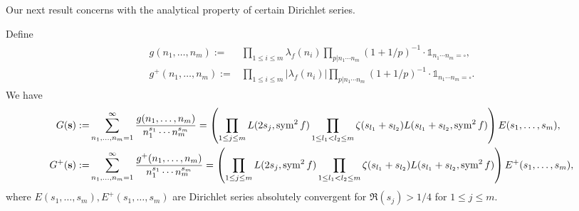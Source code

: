 \documentclass[twoside,leqno,10pt, A4]{amsart}
\begin{document}
    Our next result concerns with the analytical property of certain Dirichlet series.
\begin{lemma}\label{Dirichletseries}
  Define
  \begin{align}
  \label{f}
  \begin{split}
g(n_1, \ldots, n_{m}):= & \prod_{1\leq i\leq m}\lambda_f(n_i)\prod_{p|n_1\cdots n_m}(1+1/p)^{-1}\cdot \mathds{1}_{n_1\cdots n_m=\square}, \\
g^+(n_1, \ldots, n_{m}):= & \prod_{1\leq i\leq m}|\lambda_f(n_i)|\prod_{p|n_1\cdots n_m}(1+1/p)^{-1}\cdot \mathds{1}_{n_1\cdots n_m=\square}.
\end{split}
  \end{align}
We have
\begin{align}
 \label{Gdef}
  \begin{split}
G({\bf s}):=& \sum_{n_1, \ldots, n_{m}=1}^{\infty} \frac{g(n_1, \ldots, n_{m})}{n_1^{s_1} \cdots n_m^{s_{m}}} =  \left( \prod_{1 \leq j \leq m} L(2s_j, \operatorname{sym}^2f ) \prod_{1 \leq l_1 < l_2 \leq m} \zeta(s_{l_1} + s_{l_2})L (s_{l_1} + s_{l_2},\operatorname{sym}^2f)\right) E(s_1, \ldots, s_{m}), \\
 G^+({\bf s}):=& \sum_{n_1, \ldots, n_{m}=1}^{\infty} \frac{g^+(n_1, \ldots, n_{m})}{n_1^{s_1} \cdots n_m^{s_{m}}} =  \left( \prod_{1 \leq j \leq m} L(2s_j, \operatorname{sym}^2f ) \prod_{1 \leq l_1 < l_2 \leq m} \zeta(s_{l_1} + s_{l_2})L (s_{l_1} + s_{l_2},\operatorname{sym}^2f)\right) E^+(s_1, \ldots, s_{m}),
\end{split}
\end{align}
where \( E(s_1, \ldots, s_{m}), E^+(s_1, \ldots, s_{m})  \) are Dirichlet series absolutely convergent for \( \Re(s_j) > 1/4 \) for \( 1 \leq j \leq m \).
\end{lemma}
\end{document}
